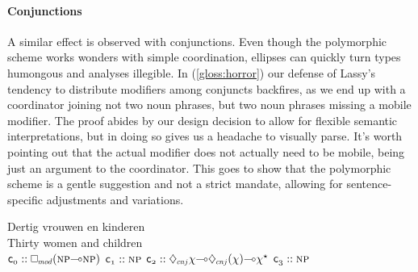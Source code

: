 \paragraph{Conjunctions}
A similar effect is observed with conjunctions.
Even though the polymorphic scheme works wonders with simple coordination, ellipses can quickly turn types humongous and analyses illegible.
In (\ref{gloss:horror}) our defense of Lassy's tendency to distribute modifiers among conjuncts backfires, as we end up with a coordinator joining not two noun phrases, but two noun phrases missing a mobile modifier. 
The proof abides by our design decision to allow for flexible semantic interpretations, but in doing so gives us a headache to visually parse.
It's worth pointing out that the actual modifier does not actually need to be mobile, being just an argument to the coordinator.
This goes to show that the polymorphic scheme is a gentle suggestion and not a strict mandate, allowing for sentence-specific adjustments and variations.

\begin{exe}
\label{gloss:horror}
\glll Dertig vrouwen en kinderen\\
Thirty women and children\\
	$\con{0}::\dbox{mod}(\np[s]\li\np[s])$
	$\con{1}::\np[s]$
	$\con{2}::\ddia{cnj}{\chi}\li\ddia{cnj}(\chi)\li\chi^\star$
	$\con{3}::\np[s]$
\\
\end{exe}

